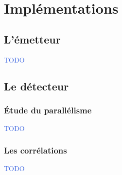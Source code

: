 \documentclass[../main.tex]{subfiles}
\begin{document}
\section{Implémentations}

\subsection{L'émetteur}

\begin{frame}{\subsecname}
  \begin{center}
    \textcolor{RoyalBlue}{TODO}
  \end{center}
\end{frame}

\subsection{Le détecteur}

\subsubsection{Étude du parallélisme}

\begin{frame}{\subsecname}
  \begin{center}
    \textcolor{RoyalBlue}{TODO}
  \end{center}
\end{frame}

\subsubsection{Les corrélations}

\begin{frame}{}
  \begin{center}
    \textcolor{RoyalBlue}{TODO}
  \end{center}
\end{frame}
\end{document}
